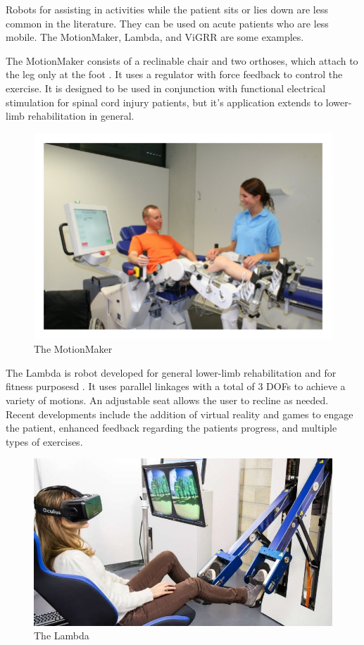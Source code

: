\documentclass[12pt]{report}
\begin{document}
	Robots for assisting in activities while the patient sits or lies down are less common in the literature. They can be used on acute patients who are less mobile. The MotionMaker, Lambda, and ViGRR are some examples. 
	
	The MotionMaker consists of a reclinable chair and two orthoses, which attach to the leg only at the foot \cite{Schmitt2004}. It uses a regulator with force feedback to control the exercise. It is designed to be used in conjunction with functional electrical stimulation for spinal cord injury patients, but it's application extends to lower-limb rehabilitation in general. 
	
	\begin{figure}[h] 
		\centering
		\includegraphics[width=0.75\linewidth]{Motionmaker}
		\caption{The MotionMaker}
		\label{fig:Motionmaker}
	\end{figure}
	
	The Lambda is robot developed for general lower-limb rehabilitation and for fitness purposesd \cite{Bouri2009}. It uses parallel linkages with a total of 3 DOFs to achieve a variety of motions. An adjustable seat allows the user to recline as needed. Recent developments include the addition of virtual reality and games to engage the patient, enhanced feedback regarding the patients progress, and multiple types of exercises. 
	
	\begin{figure}[t] 
		\centering
		\includegraphics[width=0.75\linewidth]{Lambda}
		\caption{The Lambda}
		\label{fig:Lambda}
	\end{figure}
	
\end{document}
